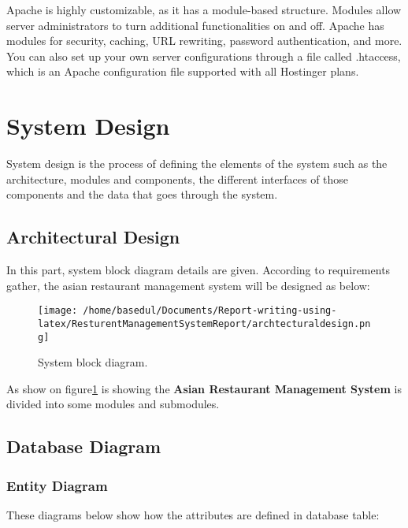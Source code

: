 \documentclass[12pt,a4paper]{article}
\newcommand\tab[1][1cm]{\hspace*{#1}}
\begin{document}
\tab Apache is highly customizable, as it has a module-based structure. Modules allow server administrators to turn additional functionalities on and off. Apache has modules for security, caching, URL rewriting, password authentication, and more. You can also set up your own server configurations through a file called .htaccess, which is an Apache configuration file supported with all Hostinger plans.\\
		
\newpage
\section{System Design}
\tab System design is the process of defining the elements of the system such as the
architecture, modules and components, the different interfaces of those components and
the data that goes through the system.\\
\subsection{Architectural Design}
	\tab In this part, system block diagram details are given. According to requirements
gather, the asian restaurant management system will be designed as below:	
	\begin{figure}[H]
		\centering
		\texttt{[image: /home/basedul/Documents/Report-writing-using-latex/ResturentManagementSystemReport/archtecturaldesign.png]}
		\caption{System block diagram.}
		\label{fig:archi} 
	\end{figure}
		
	\tab As show on figure\ref{fig:archi} is showing the \textbf{Asian Restaurant Management System} is divided into some modules and submodules.
\subsection{Database Diagram}
	\subsubsection{Entity Diagram}
	\tab These diagrams below show how the attributes are defined in database table:\\
	
\end{document}
